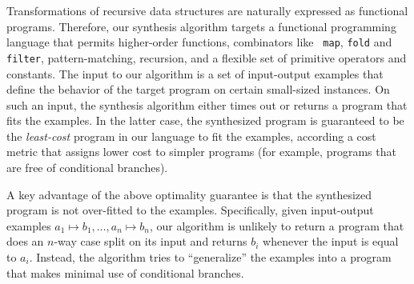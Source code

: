 \begin{comment}
Consider, for instance, the following scenarios:
\begin{itemize}
\item A user wants to modify the content of directories that match
  certain patterns. Since the directory structure
  can be viewed as a tree, the user effectively needs to write a
  script that maps an input tree to a new output tree.

\item Given a list of student homework scores, a high school teacher
  wants to drop the minimum score for each student.  To automate this
  task, the teacher must write a program that takes in a list
  consisting of lists $l_i$ (where $l_i$ contains the scores for the
  $i$-th student), and produces a new list of lists.

\item A social scientist has a list of answers to a survey question
  and wants to know how often a given answer appears. That is, given
  an input list of strings, she needs to produce an output list of
  (string, integer) pairs where the integer denotes the frequency of
  the corresponding string in the input list.
\end{itemize}
\end{comment}

Transformations of recursive data structures are naturally expressed
as functional programs. 
Therefore, our synthesis algorithm targets a functional programming
language that permits higher-order functions, combinators like {\tt
  map}, {\tt fold} and {\tt filter}, pattern-matching, recursion, and
a flexible set of primitive operators and constants. The input to our
algorithm is a set of input-output examples that define the behavior
of the target program on certain small-sized instances. On such an
input, the synthesis algorithm either times out or returns a program
that fits the examples. In the latter case, the synthesized program is
guaranteed to be the {\em least-cost} program in our language to fit
the examples, according a cost metric that assigns lower cost to
simpler programs (for example, programs that are free of conditional
branches).

A key advantage of the above optimality guarantee is that the
synthesized program is not over-fitted to the examples. Specifically,
given input-output examples $a_1 \mapsto b_1,\dots, a_n \mapsto b_n$,
our algorithm is unlikely to return a program that does an $n$-way
case split on its input and returns $b_i$ whenever the input is equal
to $a_i$. Instead, the algorithm tries to ``generalize'' the examples
into a program that makes minimal use of conditional branches.

